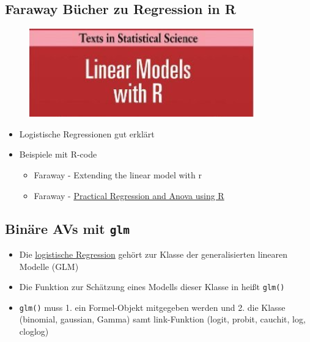 \documentclass[]{article}
\providecommand{\tightlist}{%
  \setlength{\itemsep}{0pt}\setlength{\parskip}{0pt}}
\begin{document}
\subsection{Faraway Bücher zu Regression in
R}\label{faraway-bucher-zu-regression-in-r}

\begin{figure}[htbp]
\centering
\includegraphics{figure/Faraway.PNG}
\caption{}
\end{figure}

\begin{itemize}
\item
  Logistische Regressionen gut erklärt
\item
  Beispiele mit R-code

  \begin{itemize}
  \item
    Faraway - Extending the linear model with r
  \item
    Faraway -
    \href{https://cran.r-project.org/doc/contrib/Faraway-PRA.pdf}{Practical
    Regression and Anova using R}
  \end{itemize}
\end{itemize}

\subsection{\texorpdfstring{Binäre AVs mit
\texttt{glm}}{Binäre AVs mit glm}}\label{binare-avs-mit-glm}

\begin{itemize}
\tightlist
\item
  Die \href{http://data.princeton.edu/R/glms.html}{logistische
  Regression} gehört zur Klasse der generalisierten linearen Modelle
  (GLM)
\item
  Die Funktion zur Schätzung eines Modells dieser Klasse in heißt
  \texttt{glm()}
\item
  \texttt{glm()} muss 1. ein Formel-Objekt mitgegeben werden und 2. die
  Klasse (binomial, gaussian, Gamma) samt link-Funktion (logit, probit,
  cauchit, log, cloglog)
\end{itemize}
\end{document}

